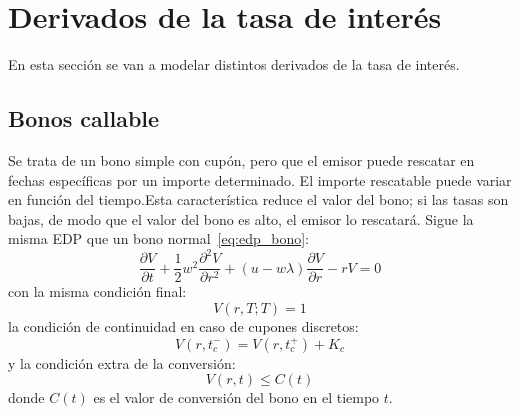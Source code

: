 \section{Derivados de la tasa de interés}

En esta sección se van a modelar distintos derivados de la tasa de interés.


\subsection{Bonos callable}
Se trata de un bono simple con cupón, pero que el emisor puede rescatar en fechas específicas por un importe determinado. El importe rescatable puede variar en función del tiempo.Esta característica reduce el valor del bono; si las tasas son bajas, de modo que el valor del bono es alto, el emisor lo rescatará.
Sigue la misma EDP que un bono normal~\eqref{eq:edp_bono}:
\begin{equation*}
    \boxed{\frac{\partial V}{\partial t} + \frac{1}{2} w^2 \frac{\partial^2 V}{\partial r^2} + (u - w\lambda) \frac{\partial V}{\partial r} - rV = 0}
\end{equation*}
con la misma condición final:
\begin{equation*}
    \boxed{V(r,T;T) = 1}
\end{equation*}
la condición de continuidad en caso de cupones discretos:
\begin{equation*}
    \boxed{V(r, t_c^-) = V(r, t_c^+) + K_c}
\end{equation*}
y la condición extra de la conversión:
\begin{equation*}
    \boxed{V(r,t) \leq C(t)}
\end{equation*}
donde $C(t)$ es el valor de conversión del bono en el tiempo $t$.












